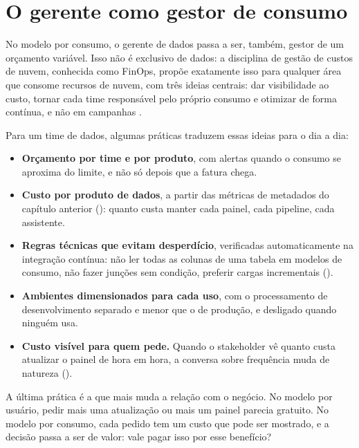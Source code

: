 \section{O gerente como gestor de consumo}
\label{sec:gestao-consumo}

No modelo por consumo, o gerente de dados passa a ser, também, gestor de um orçamento
variável. Isso não é exclusivo de dados: a disciplina de gestão de custos de nuvem, conhecida
como FinOps, propõe exatamente isso para qualquer área que consome recursos de nuvem, com três
ideias centrais: dar visibilidade ao custo, tornar cada time responsável pelo próprio consumo
e otimizar de forma contínua, e não em campanhas \parencite{storment2023,finops2026}.

Para um time de dados, algumas práticas traduzem essas ideias para o dia a dia:

\begin{itemize}
  \item \textbf{Orçamento por time e por produto}, com alertas quando o consumo se aproxima do
    limite, e não só depois que a fatura chega.
  \item \textbf{Custo por produto de dados}, a partir das métricas de metadados do capítulo
    anterior (): quanto custa manter cada painel, cada pipeline, cada
    assistente.
  \item \textbf{Regras técnicas que evitam desperdício}, verificadas automaticamente na
    integração contínua: não ler todas as colunas de uma tabela em modelos de consumo, não
    fazer junções sem condição, preferir cargas incrementais ().
  \item \textbf{Ambientes dimensionados para cada uso}, com o processamento de
    desenvolvimento separado e menor que o de produção, e desligado quando ninguém usa.
  \item \textbf{Custo visível para quem pede.} Quando o stakeholder vê quanto custa atualizar
    o painel de hora em hora, a conversa sobre frequência muda de natureza
    ().
\end{itemize}

A última prática é a que mais muda a relação com o negócio. No modelo por usuário, pedir mais
uma atualização ou mais um painel parecia gratuito. No modelo por consumo, cada pedido tem
um custo que pode ser mostrado, e a decisão passa a ser de valor: vale pagar isso por esse
benefício?


